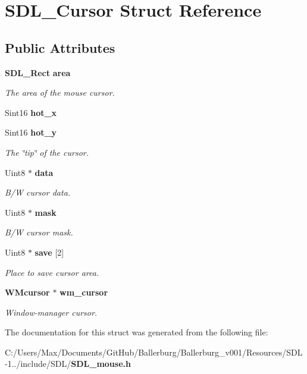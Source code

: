 \section{S\+D\+L\+\_\+\+Cursor Struct Reference}
\label{struct_s_d_l___cursor}
\subsection*{Public Attributes}
\begin{DoxyCompactItemize}
\item 
{\bf S\+D\+L\+\_\+\+Rect} {\bf area}\label{struct_s_d_l___cursor_afefd14bbad7b59dbf22d63352ced7378}

\begin{DoxyCompactList}\small\item\em The area of the mouse cursor. \end{DoxyCompactList}\item 
Sint16 {\bfseries hot\+\_\+x}\label{struct_s_d_l___cursor_a9560ccf14c4b7eb5dd905c6af57ba3e1}

\item 
Sint16 {\bf hot\+\_\+y}\label{struct_s_d_l___cursor_a154ec5999705b912aa09b1f1bacb3275}

\begin{DoxyCompactList}\small\item\em The \char`\"{}tip\char`\"{} of the cursor. \end{DoxyCompactList}\item 
Uint8 $\ast$ {\bf data}\label{struct_s_d_l___cursor_ae7f8c81028205f9359f0171f2a82ec04}

\begin{DoxyCompactList}\small\item\em B/\+W cursor data. \end{DoxyCompactList}\item 
Uint8 $\ast$ {\bf mask}\label{struct_s_d_l___cursor_afaec3f604b8a83986bab02eee024c5eb}

\begin{DoxyCompactList}\small\item\em B/\+W cursor mask. \end{DoxyCompactList}\item 
Uint8 $\ast$ {\bf save} [2]\label{struct_s_d_l___cursor_a44a8edebf057e76e048512a57c5630e0}

\begin{DoxyCompactList}\small\item\em Place to save cursor area. \end{DoxyCompactList}\item 
{\bf W\+Mcursor} $\ast$ {\bf wm\+\_\+cursor}\label{struct_s_d_l___cursor_ab133c48a66abe3831e5ad18467d9ef3d}

\begin{DoxyCompactList}\small\item\em Window-\/manager cursor. \end{DoxyCompactList}\end{DoxyCompactItemize}


The documentation for this struct was generated from the following file\+:\begin{DoxyCompactItemize}
\item 
C\+:/\+Users/\+Max/\+Documents/\+Git\+Hub/\+Ballerburg/\+Ballerburg\+\_\+v001/\+Resources/\+S\+D\+L-\/1../include/\+S\+D\+L/{\bf S\+D\+L\+\_\+mouse.\+h}\end{DoxyCompactItemize}
